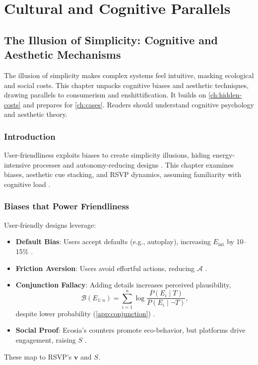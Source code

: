 \documentclass[openany]{book}
\newcommand{\vvec}{\mathbf{v}} %
\newcommand{\Sent}{S} %
\newcommand{\Eint}{E_{\mathrm{int}}} %
\newcommand{\Auton}{\mathcal{A}} %
\begin{document}
\part{Cultural and Cognitive Parallels}

\chapter{The Illusion of Simplicity: Cognitive and Aesthetic Mechanisms}
\label{ch:illusion}

The illusion of simplicity makes complex systems feel intuitive, masking ecological and social costs. This chapter unpacks cognitive biases and aesthetic techniques, drawing parallels to consumerism and enshittification. It builds on \cref{ch:hidden-costs} and prepares for \cref{ch:cases}. Readers should understand cognitive psychology and aesthetic theory.

\section{Introduction}
\label{sec:illusion-intro}
User-friendliness exploits biases to create simplicity illusions, hiding energy-intensive processes and autonomy-reducing designs \citep{colak2024,doctorow2022}. This chapter examines biases, aesthetic cue stacking, and RSVP dynamics, assuming familiarity with cognitive load \citep{norman1988}.

\section{Biases that Power Friendliness}
\label{sec:biases}
User-friendly designs leverage:
\begin{itemize}
  \item \textbf{Default Bias}: Users accept defaults (e.g., autoplay), increasing \(\Eint\) by 10--15\% \citep{colak2024}.
  \item \textbf{Friction Aversion}: Users avoid effortful actions, reducing \(\Auton\) \citep{doctorow2022}.
  \item \textbf{Conjunction Fallacy}: Adding details increases perceived plausibility,
  \begin{equation}
  \label{eq:believability}
  \mathcal{B}(E_{1:n}) = \sum_{i=1}^n \log\frac{P(E_i \mid T)}{P(E_i \mid \neg T)},
  \end{equation}
  despite lower probability (\cref{app:conjunction}) \citep{tversky1983}.
  \item \textbf{Social Proof}: Ecosia’s counters promote eco-behavior, but platforms drive engagement, raising \(\Sent\) \citep{colak2024}.
\end{itemize}
These map to RSVP’s \(\vvec\) and \(\Sent\).
\end{document}

